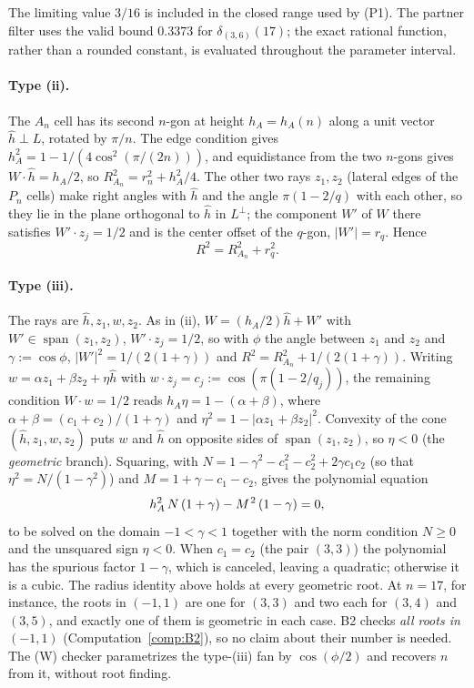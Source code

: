 \documentclass[11pt]{article}
\theoremstyle{definition}
\theoremstyle{remark}
\newcommand{\spn}{\operatorname{span}}
\begin{document}
The limiting value $3/16$ is included in the closed range used by (P1).
The partner filter uses the valid bound $0.3373$ for
$\delta_{(3,6)}(17)$; the exact rational function, rather than a rounded
constant, is evaluated throughout the parameter interval.

\paragraph{Type (ii).} The $A_n$ cell has its second $n$-gon at height
$h_A=h_A(n)$ along a unit vector $\hat h\perp L$, rotated by $\pi/n$. The
edge condition gives $h_A^2=1-1/(4\cos^2(\pi/(2n)))$, and equidistance from
the two $n$-gons gives $W\cdot\hat h=h_A/2$, so
$R_{A_n}^2=r_n^2+h_A^2/4$. The other two rays $z_1,z_2$ (lateral edges of
the $P_n$ cells) make right angles with $\hat h$ and the angle $\pi(1-2/q)$
with each other, so they lie in the plane orthogonal to $\hat h$ in
$L^\perp$; the component $W'$ of $W$ there satisfies $W'\cdot z_j=1/2$ and is
the center offset of the $q$-gon, $|W'|=r_q$. Hence
\[R^2=R_{A_n}^2+r_q^2.\]

\paragraph{Type (iii).} The rays are $\hat h,z_1,w,z_2$. As in (ii),
$W=(h_A/2)\hat h+W'$ with $W'\in\spn(z_1,z_2)$, $W'\cdot z_j=1/2$, so with
$\phi$ the angle between $z_1$ and $z_2$ and $\gamma:=\cos\phi$,
$|W'|^2=1/(2(1+\gamma))$ and $R^2=R_{A_n}^2+1/(2(1+\gamma))$. Writing
$w=\alpha z_1+\beta z_2+\eta\hat h$ with $w\cdot z_j=c_j:=\cos(\pi(1-2/q_j))$,
the remaining condition $W\cdot w=1/2$ reads $h_A\eta=1-(\alpha+\beta)$, where
$\alpha+\beta=(c_1+c_2)/(1+\gamma)$ and $\eta^2=1-|\alpha z_1+\beta z_2|^2$.
Convexity of the cone $(\hat h,z_1,w,z_2)$ puts $w$ and $\hat h$ on opposite
sides of $\spn(z_1,z_2)$, so $\eta<0$ (the \emph{geometric} branch).
Squaring, with $N=1-\gamma^2-c_1^2-c_2^2+2\gamma c_1c_2$ (so that
$\eta^2=N/(1-\gamma^2)$) and $M=1+\gamma-c_1-c_2$, gives the polynomial
equation
\[
h_A^2\,N\,(1+\gamma)-M^{\mkern2mu 2}\,(1-\gamma)=0,
\]
to be solved on the domain $-1<\gamma<1$ together with the norm condition
$N\ge0$ and the unsquared sign $\eta<0$. When $c_1=c_2$ (the pair $(3,3)$)
the polynomial has the spurious factor $1-\gamma$, which is canceled,
leaving a quadratic; otherwise it is a cubic. The radius identity above
holds at every geometric root. At $n=17$, for instance, the roots in
$(-1,1)$ are one for $(3,3)$ and two each for $(3,4)$ and $(3,5)$, and exactly one of them is geometric in each case. B2 checks \emph{all roots in $(-1,1)$}
(Computation~\ref{comp:B2}), so no claim about their number is needed.
The (W) checker parametrizes the type-(iii) fan by $\cos(\phi/2)$
and recovers $n$ from it, without root finding.
\end{document}
